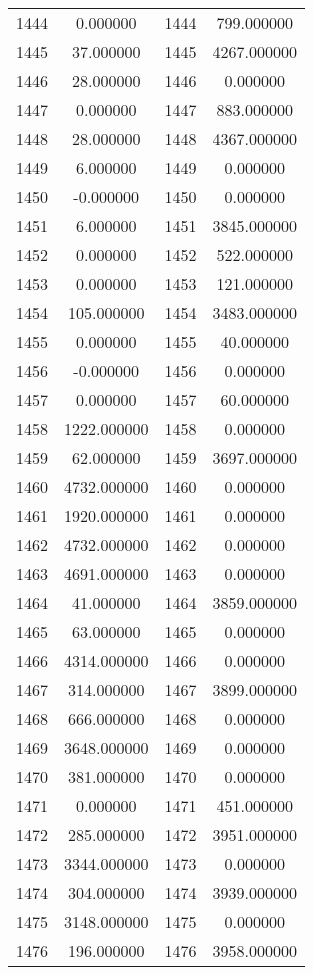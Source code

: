 \documentclass[12pt]{article}
\begin{document}
\begin{longtable}{@{}cccc@{}}
1444 & 0.000000 & 1444 & 799.000000 \\
1445 & 37.000000 & 1445 & 4267.000000 \\
1446 & 28.000000 & 1446 & 0.000000 \\
1447 & 0.000000 & 1447 & 883.000000 \\
1448 & 28.000000 & 1448 & 4367.000000 \\
1449 & 6.000000 & 1449 & 0.000000 \\
1450 & -0.000000 & 1450 & 0.000000 \\
1451 & 6.000000 & 1451 & 3845.000000 \\
1452 & 0.000000 & 1452 & 522.000000 \\
1453 & 0.000000 & 1453 & 121.000000 \\
1454 & 105.000000 & 1454 & 3483.000000 \\
1455 & 0.000000 & 1455 & 40.000000 \\
1456 & -0.000000 & 1456 & 0.000000 \\
1457 & 0.000000 & 1457 & 60.000000 \\
1458 & 1222.000000 & 1458 & 0.000000 \\
1459 & 62.000000 & 1459 & 3697.000000 \\
1460 & 4732.000000 & 1460 & 0.000000 \\
1461 & 1920.000000 & 1461 & 0.000000 \\
1462 & 4732.000000 & 1462 & 0.000000 \\
1463 & 4691.000000 & 1463 & 0.000000 \\
1464 & 41.000000 & 1464 & 3859.000000 \\
1465 & 63.000000 & 1465 & 0.000000 \\
1466 & 4314.000000 & 1466 & 0.000000 \\
1467 & 314.000000 & 1467 & 3899.000000 \\
1468 & 666.000000 & 1468 & 0.000000 \\
1469 & 3648.000000 & 1469 & 0.000000 \\
1470 & 381.000000 & 1470 & 0.000000 \\
1471 & 0.000000 & 1471 & 451.000000 \\
1472 & 285.000000 & 1472 & 3951.000000 \\
1473 & 3344.000000 & 1473 & 0.000000 \\
1474 & 304.000000 & 1474 & 3939.000000 \\
1475 & 3148.000000 & 1475 & 0.000000 \\
1476 & 196.000000 & 1476 & 3958.000000 \\

\end{longtable}
\end{document}

